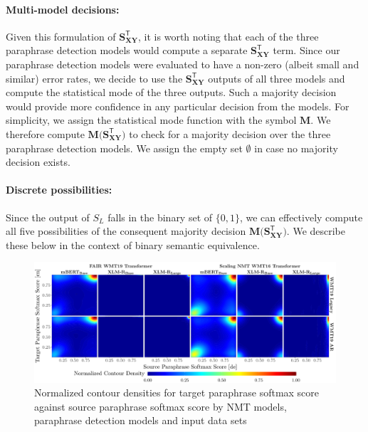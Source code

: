 \documentclass[11pt,a4paper]{article}
\begin{document}
\paragraph{Multi-model decisions:} Given this formulation of $\mathbf{S_{XY}^{\mathsf{T}}}$, it is worth noting that each of the three paraphrase detection models would compute a separate $\mathbf{S_{XY}^{\mathsf{T}}}$ term. Since our paraphrase detection models were evaluated to have a non-zero (albeit small and similar) error rates, we decide to use the $\mathbf{S_{XY}^{\mathsf{T}}}$ outputs of all three models and compute the statistical mode of the three outputs. Such a majority decision would provide more confidence in any particular decision from the models. For simplicity, we assign the statistical mode function with the symbol $\mathbf{M}$. We therefore compute $\mathbf{M(S_{XY}^{\mathsf{T}}})$ to check for a majority decision over the three paraphrase detection models. We assign the empty set $\emptyset$ in case no majority decision exists.

\paragraph{Discrete possibilities:} Since the output of $S_L$ falls in the binary set of $\{0,1\}$, we can effectively compute all five possibilities of the consequent majority decision $\mathbf{M(S_{XY}^{\mathsf{T}}})$. We describe these below in the context of binary semantic equivalence.

\begin{figure}
  \centering 
  \includegraphics[trim={0cm 0cm 0cm 0cm},clip,width=\textwidth]{paraphrase_detection_softmax_all.pdf}
  \caption{Normalized contour densities for target paraphrase softmax score against source paraphrase softmax score by NMT models, paraphrase detection models and input data sets}
  \label{paraphrase_detection_softmax_all}
\end{figure}
\end{document}
